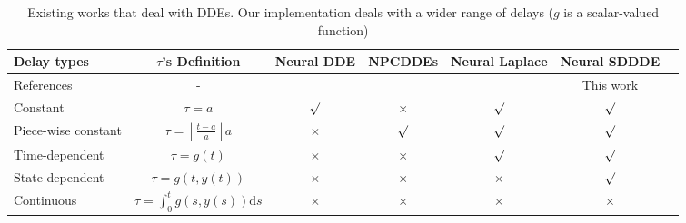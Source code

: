

\begin{table}
\caption{Existing works that deal with DDEs. Our implementation deals with a wider range of delays ($g$ is a scalar-valued function)}
\label{table_delays}
\vskip 0.15in
\begin{center}
\begin{small}
 \resizebox{16cm}{!}
{
\begin{tabular}{lcccccc}
\toprule
Delay types & $\tau$'s Definition & Neural DDE & NPCDDEs & Neural Laplace & Neural SDDDE \\
\midrule
References & - & \citet{first_neural_dde} & \citet{neural_piece_wise_dde} & \citet{neural_laplace} & This work \\
Constant & $\tau = a$ & $\surd$ & $\times$ & $\surd$ & $\surd$ \\
Piece-wise constant & $\tau = \left\lfloor \frac{t-a}{a} \right\rfloor a$ & $\times$ & $\surd$ & $\surd$ & $\surd$ \\
Time-dependent & $\tau = g(t)$ & $\times$ & $\times$ & $\surd$ & $\surd$ \\
State-dependent & $\tau = g(t, y(t))$ & $\times$ & $\times$ & $\times$ & $\surd$ \\
Continuous & $\tau = \int_0^{t}g(s, y(s)) \mathrm{d}s$ & $\times$ & $\times$ & $\times$ & $\times$ \\
\bottomrule
\end{tabular}
}
\end{small}
\end{center}
\end{table}